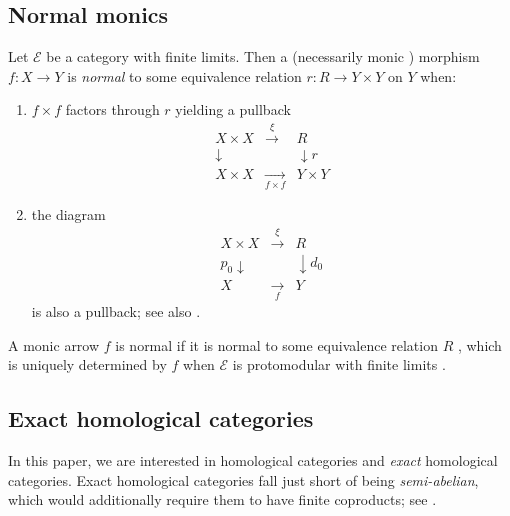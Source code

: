 \documentclass[12pt]{amsart}
\theoremstyle{definition}
\begin{document}
\subsection{Normal monics}

Let $\mathcal{E}$ be a category with finite limits. Then a (necessarily
monic \cite[Lemma 3.2.2]{borceux_malcev_2004}) morphism $f:X\rightarrow Y$
is \emph{normal} to some equivalence relation $r:R\rightarrow Y\times Y$ on $%
Y$ \cite[Definition 3.2.1]{borceux_malcev_2004} when:

\begin{enumerate}
\item $f\times f$ factors through $r$ yielding a pullback%
\begin{equation*}
\begin{array}{ccc}
X\times X & \overset{\xi }{\rightarrow } & R \\ 
\downarrow &  & \downarrow r \\ 
X\times X & \underset{f\times f}{\rightarrow } & Y\times Y%
\end{array}%
\end{equation*}

\item the diagram%
\begin{equation*}
\begin{array}{ccc}
X\times X & \overset{\xi }{\rightarrow } & R \\ 
p_{0}\downarrow &  & \downarrow d_{0} \\ 
X & \underset{f}{\rightarrow } & Y%
\end{array}%
\end{equation*}%
is also a pullback; see also \cite{bourn_normal_2000,bourn_direct_2005}.
\end{enumerate}

A monic arrow $f$ is normal if it is normal to some equivalence relation $R$%
, which is uniquely determined by $f$ when $\mathcal{E}$ is protomodular
with finite limits \cite[Theorem 3.2.8]{borceux_malcev_2004}.

\subsection{Exact homological categories}

In this paper, we are interested in homological categories and \emph{exact}
homological categories. Exact homological categories fall just short of
being \emph{semi-abelian}, which would additionally require them to have
finite coproducts; see \cite[Section 2.5]{janelidze_semi-abelian_2002}.
\end{document}
